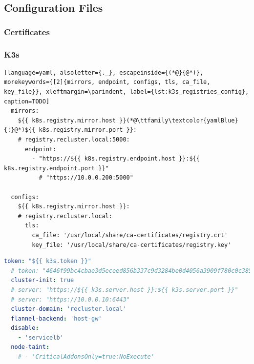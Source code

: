 \subsection{Configuration Files}
\label{subsec:implementation_installer_configuration_files}


\subsubsection{Certificates}
\label{subsubsec:implementation_installer_configuration_files_certificates}

\subsubsection{K3s}
\label{subsubsec:implementation_installer_configuration_files_k3s}

\begin{lstlisting}[language=yaml, alsoletter={._}, escapeinside={(*@}{@*)}, morekeywords={[2]{mirrors, endpoint, configs, tls, ca_file, key_file}}, xleftmargin=\parindent, label={lst:k3s_registries_config}, caption=TODO]
  mirrors:
    ${{ k8s.registry.mirror.host }}(*@\ttfamily\textcolor{yamlBlue}{:}@*)${{ k8s.registry.mirror.port }}:
    # registry.recluster.local:5000:
      endpoint:
        - "https://${{ k8s.registry.endpoint.host }}:${{ k8s.registry.endpoint.port }}"
          # "https://10.0.0.200:5000"

  configs:
    ${{ k8s.registry.mirror.host }}:
    # registry.recluster.local:
      tls:
        ca_file: '/usr/local/share/ca-certificates/registry.crt'
        key_file: '/usr/local/share/ca-certificates/registry.key'
\end{lstlisting}

\begin{lstlisting}[language=yaml, alsoletter={.-}, morekeywords={[2]{token, cluster-init, cluster-domain, flannel-backend, disable, node-taint}}, xleftmargin=\parindent, label={lst:k3s_controller_config}, caption=TODO]
  token: "${{ k3s.token }}"
  # token: "4646f99bc4cbae3d5eceed856b337c9d3284be0d4056a3909f780c0c385fbf93"
  cluster-init: true
  # server: "https://${{ k3s.server.host }}:${{ k3s.server.port }}"
  # server: "https://10.0.0.10:6443"
  cluster-domain: 'recluster.local'
  flannel-backend: 'host-gw'
  disable:
    - 'servicelb'
  node-taint:
    # - 'CriticalAddonsOnly=true:NoExecute'
\end{lstlisting}

